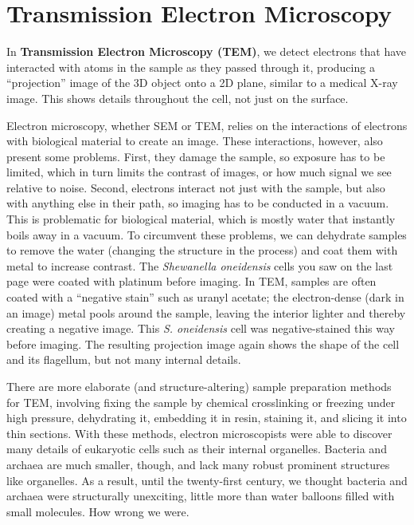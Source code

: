 \documentclass[]{tufte-book}
\begin{document}
\hypertarget{transmission-electron-microscopy}{%
\section{Transmission Electron Microscopy}\label{transmission-electron-microscopy}}

In \textbf{Transmission Electron Microscopy (TEM)}, we detect electrons that have interacted with atoms in the sample as they passed through it, producing a ``projection'' image of the 3D object onto a 2D plane, similar to a medical X-ray image. This shows details throughout the cell, not just on the surface.

Electron microscopy, whether SEM or TEM, relies on the interactions of electrons with biological material to create an image. These interactions, however, also present some problems. First, they damage the sample, so exposure has to be limited, which in turn limits the contrast of images, or how much signal we see relative to noise. Second, electrons interact not just with the sample, but also with anything else in their path, so imaging has to be conducted in a vacuum. This is problematic for biological material, which is mostly water that instantly boils away in a vacuum. To circumvent these problems, we can dehydrate samples to remove the water (changing the structure in the process) and coat them with metal to increase contrast. The \emph{Shewanella oneidensis} cells you saw on the last page were coated with platinum before imaging. In TEM, samples are often coated with a ``negative stain'' such as uranyl acetate; the electron-dense (dark in an image) metal pools around the sample, leaving the interior lighter and thereby creating a negative image. This \emph{S. oneidensis} cell was negative-stained this way before imaging. The resulting projection image again shows the shape of the cell and its flagellum, but not many internal details.

There are more elaborate (and structure-altering) sample preparation methods for TEM, involving fixing the sample by chemical crosslinking or freezing under high pressure, dehydrating it, embedding it in resin, staining it, and slicing it into thin sections. With these methods, electron microscopists were able to discover many details of eukaryotic cells such as their internal organelles. Bacteria and archaea are much smaller, though, and lack many robust prominent structures like organelles. As a result, until the twenty-first century, we thought bacteria and archaea were structurally unexciting, little more than water balloons filled with small molecules. How wrong we were.
\end{document}
